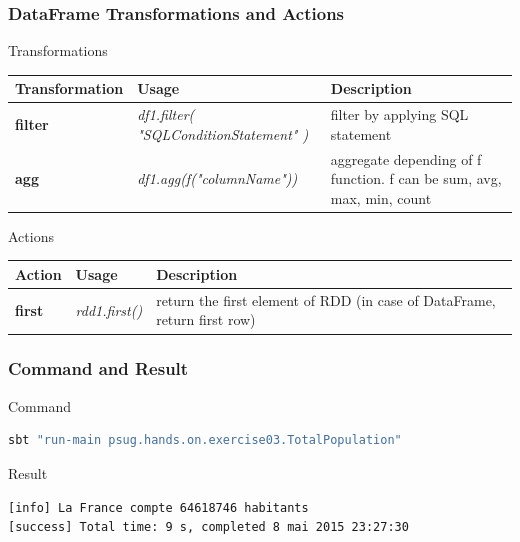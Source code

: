 \documentclass[slidetop,9pt,utf8]{beamer}
\begin{document}
\begin{frame}

  \frametitle{DataFrame Transformations and Actions}

  \begin{block}{Transformations}
    \begin{center}
      \begin{tabular}{|m{2.1cm}|m{3.5cm}|m{5cm}|}
        \hline 
        \rowcolor{gray} \textbf{Transformation} & \textbf{Usage} & \textbf{Description} \\ \hline
        \textbf{filter} & \textit{df1.filter( \newline  "SQLConditionStatement" \newline )} & filter by applying SQL statement \\ \hline
        \textbf{agg} & \textit{df1.agg(f("columnName"))} & aggregate depending of f function. f can be sum, avg, max, min, count\\ \hline
      \end{tabular}
    \end{center}
  \end{block}

  \begin{block}{Actions}
    \begin{center}
      \begin{tabular}{|m{2.1cm}|m{3.5cm}|m{5cm}|}
        \hline 
        \rowcolor{gray} \textbf{Action} & \textbf{Usage} & \textbf{Description} \\ \hline
        \textbf{first} & \textit{rdd1.first()} & return the first element of RDD (in case of DataFrame, return first row) \\ \hline
      \end{tabular}
    \end{center}
  \end{block}

\end{frame}

\begin{frame}[fragile]
  \frametitle{Command and Result}

  \begin{block}{Command}
    \begin{lstlisting}[language=bash, style=terminal-medium]
sbt "run-main psug.hands.on.exercise03.TotalPopulation"
    \end{lstlisting}
  \end{block}

  \begin{block}{Result}
    \begin{lstlisting}[style=terminal]
[info] La France compte 64618746 habitants
[success] Total time: 9 s, completed 8 mai 2015 23:27:30
    \end{lstlisting}
  \end{block}

\end{frame}
\end{document}
